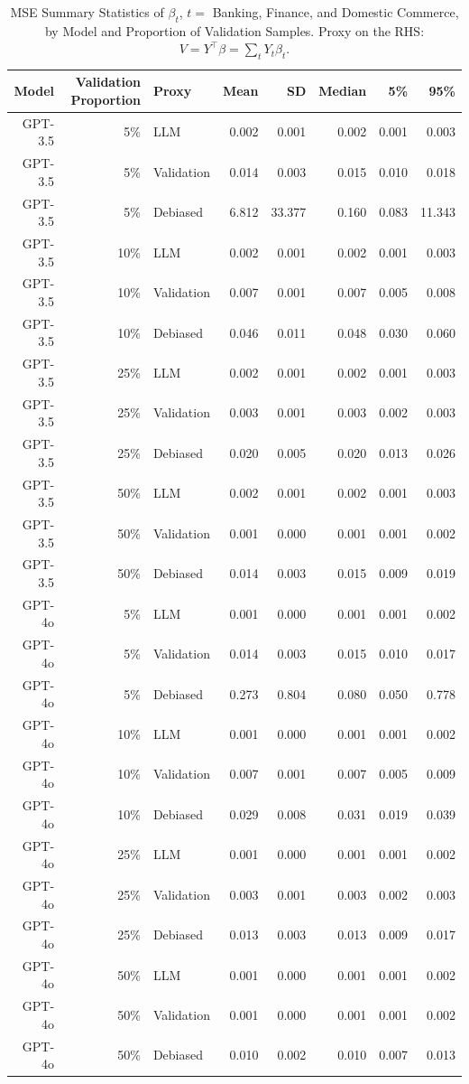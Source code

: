 \begin{table}

\caption{MSE Summary Statistics of $\beta_{t}$, $t=$ Banking, Finance, and Domestic Commerce, by Model and Proportion of Validation Samples. Proxy on the RHS: $V = Y^\top \beta = \sum_{t} Y_t \beta_t$.}
\centering
\begin{tabular}[t]{rrlrrrrr}
\toprule
Model & Validation Proportion & Proxy & Mean & SD & Median & 5\% & 95\%\\
\midrule
GPT-3.5 & 5\% & LLM & 0.002 & 0.001 & 0.002 & 0.001 & 0.003\\
GPT-3.5 & 5\% & Validation & 0.014 & 0.003 & 0.015 & 0.010 & 0.018\\
GPT-3.5 & 5\% & Debiased & 6.812 & 33.377 & 0.160 & 0.083 & 11.343\\
GPT-3.5 & 10\% & LLM & 0.002 & 0.001 & 0.002 & 0.001 & 0.003\\
GPT-3.5 & 10\% & Validation & 0.007 & 0.001 & 0.007 & 0.005 & 0.008\\
GPT-3.5 & 10\% & Debiased & 0.046 & 0.011 & 0.048 & 0.030 & 0.060\\
GPT-3.5 & 25\% & LLM & 0.002 & 0.001 & 0.002 & 0.001 & 0.003\\
GPT-3.5 & 25\% & Validation & 0.003 & 0.001 & 0.003 & 0.002 & 0.003\\
GPT-3.5 & 25\% & Debiased & 0.020 & 0.005 & 0.020 & 0.013 & 0.026\\
GPT-3.5 & 50\% & LLM & 0.002 & 0.001 & 0.002 & 0.001 & 0.003\\
GPT-3.5 & 50\% & Validation & 0.001 & 0.000 & 0.001 & 0.001 & 0.002\\
GPT-3.5 & 50\% & Debiased & 0.014 & 0.003 & 0.015 & 0.009 & 0.019\\
GPT-4o & 5\% & LLM & 0.001 & 0.000 & 0.001 & 0.001 & 0.002\\
GPT-4o & 5\% & Validation & 0.014 & 0.003 & 0.015 & 0.010 & 0.017\\
GPT-4o & 5\% & Debiased & 0.273 & 0.804 & 0.080 & 0.050 & 0.778\\
GPT-4o & 10\% & LLM & 0.001 & 0.000 & 0.001 & 0.001 & 0.002\\
GPT-4o & 10\% & Validation & 0.007 & 0.001 & 0.007 & 0.005 & 0.009\\
GPT-4o & 10\% & Debiased & 0.029 & 0.008 & 0.031 & 0.019 & 0.039\\
GPT-4o & 25\% & LLM & 0.001 & 0.000 & 0.001 & 0.001 & 0.002\\
GPT-4o & 25\% & Validation & 0.003 & 0.001 & 0.003 & 0.002 & 0.003\\
GPT-4o & 25\% & Debiased & 0.013 & 0.003 & 0.013 & 0.009 & 0.017\\
GPT-4o & 50\% & LLM & 0.001 & 0.000 & 0.001 & 0.001 & 0.002\\
GPT-4o & 50\% & Validation & 0.001 & 0.000 & 0.001 & 0.001 & 0.002\\
GPT-4o & 50\% & Debiased & 0.010 & 0.002 & 0.010 & 0.007 & 0.013\\
\bottomrule
\end{tabular}
\end{table}
